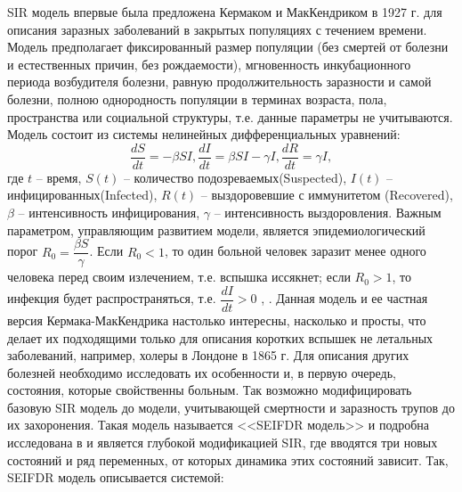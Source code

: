 SIR модель впервые была предложена Кермаком и МакКендриком в 1927 г. для описания заразных заболеваний в закрытых популяциях с течением времени. Модель предполагает фиксированный  размер популяции (без смертей от болезни и естественных причин, без рождаемости), мгновенность инкубационного периода возбудителя болезни, равную продолжительность заразности и самой болезни, полною однородность популяции в терминах возраста, пола, пространства или социальной структуры, т.е. данные параметры не учитываются. Модель состоит из системы нелинейных дифференциальных уравнений: \\
\begin{equation} \label{SIR_model:1}
	\dfrac{dS}{dt} =  -\beta SI , 
	\dfrac{dI}{dt} = \beta SI - \gamma I ,
	\dfrac{dR}{dt} = \gamma I , 	
\end{equation}
где $t$ -- время, $S(t)$ -- количество подозреваемых(Suspected), $I(t)$ -- инфицированных(Infected), $R(t)$ -- выздоровевшие с иммунитетом (Recovered), $\beta$ -- интенсивность инфицирования, $ \gamma $ -- интенсивность выздоровления. Важным параметром, управляющим развитием модели, является эпидемиологический порог $R_0 = \dfrac{\beta S}{\gamma} $. Если $R_0 < 1$, то один больной человек заразит  менее одного человека перед своим излечением, т.е. вспышка иссякнет; если $R_0 > 1$, то инфекция будет распространяться, т.е. $\dfrac{dI}{dt} > 0$  %
\cite{Wolfram_MW:SIR} \cite{Anderson_May:1979}, \cite{Kermack_McKendrick:1927}.
Данная модель и ее частная версия Кермака-МакКендрика настолько интересны, насколько и просты, что делает их подходящими только для описания  коротких вспышек не летальных заболеваний, например, холеры в Лондоне в 1865 г. Для описания других болезней необходимо исследовать их особенности и, в первую очередь, состояния, которые свойственны больным. Так возможно  модифицировать базовую SIR модель до модели, учитывающей смертности и заразность трупов до их захоронения. Такая модель называется <<SEIFDR модель>> и подробна исследована  в %
\cite{Bykova:2015} и является глубокой модификацией SIR, где вводятся три новых состояний и ряд переменных, от которых динамика этих состояний зависит. Так, SEIFDR модель описывается системой:

